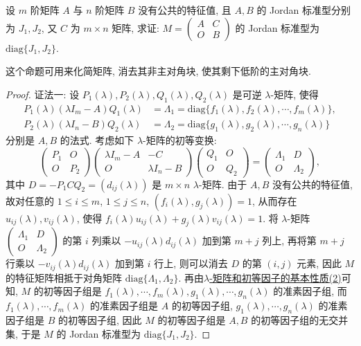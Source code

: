 \documentclass[../../main.tex]{subfiles}
\begin{document}
\begin{proposition}\label{proposition:分块上三角阵的Jordan标准型}
设 $m$ 阶矩阵 $A$ 与 $n$ 阶矩阵 $B$ 没有公共的特征值, 且 $A,B$ 的 Jordan 标准型分别为 $J_1,J_2$, 又 $C$ 为 $m \times n$ 矩阵, 求证: $M = \begin{pmatrix}A & C \\ O & B\end{pmatrix}$ 的 Jordan 标准型为 $\mathrm{diag}\{J_1,J_2\}$.
\end{proposition}
\begin{remark}
这个命题可用来化简矩阵, 消去其非主对角块, 使其剩下低阶的主对角块. 
\end{remark}
\begin{proof}
{\color{blue}证法一:}
设 $P_1(\lambda),P_2(\lambda),Q_1(\lambda),Q_2(\lambda)$ 是可逆 $\lambda$-矩阵, 使得
\begin{align*}
P_1(\lambda)(\lambda I_m - A)Q_1(\lambda) &= \Lambda_1 = \mathrm{diag}\{f_1(\lambda),f_2(\lambda),\cdots,f_m(\lambda)\},\\
P_2(\lambda)(\lambda I_n - B)Q_2(\lambda) &= \Lambda_2 = \mathrm{diag}\{g_1(\lambda),g_2(\lambda),\cdots,g_n(\lambda)\}
\end{align*}
分别是 $A,B$ 的法式. 考虑如下 $\lambda$-矩阵的初等变换:
\[
\begin{pmatrix}P_1 & O \\ O & P_2\end{pmatrix}
\begin{pmatrix}\lambda I_m - A & -C \\ O & \lambda I_n - B\end{pmatrix}
\begin{pmatrix}Q_1 & O \\ O & Q_2\end{pmatrix}
=
\begin{pmatrix}\Lambda_1 & D \\ O & \Lambda_2\end{pmatrix},
\]
其中 $D = -P_1CQ_2 = (d_{ij}(\lambda))$ 是 $m \times n$ $\lambda$-矩阵. 由于 $A,B$ 没有公共的特征值, 故对任意的 $1 \leqslant  i \leqslant  m$, $1 \leqslant  j \leqslant  n$, $(f_i(\lambda),g_j(\lambda)) = 1$, 从而存在 $u_{ij}(\lambda),v_{ij}(\lambda)$, 使得 $f_i(\lambda)u_{ij}(\lambda) + g_j(\lambda)v_{ij}(\lambda) = 1$. 将 $\lambda$-矩阵 $\begin{pmatrix}\Lambda_1 & D \\ O & \Lambda_2\end{pmatrix}$ 的第 $i$ 列乘以 $-u_{ij}(\lambda)d_{ij}(\lambda)$ 加到第 $m + j$ 列上, 再将第 $m + j$ 行乘以 $-v_{ij}(\lambda)d_{ij}(\lambda)$ 加到第 $i$ 行上, 则可以消去 $D$ 的第 $(i,j)$ 元素, 因此 $M$ 的特征矩阵相抵于对角矩阵 $\mathrm{diag}\{\Lambda_1,\Lambda_2\}$. 再由\hyperref[theorem:lambda-矩阵和初等因子的基本性质]{$\lambda$-矩阵和初等因子的基本性质(2)}可知, $M$ 的初等因子组是 $f_1(\lambda),\cdots,f_m(\lambda),g_1(\lambda),\cdots,g_n(\lambda)$ 的准素因子组, 而 $f_1(\lambda),\cdots,f_m(\lambda)$ 的准素因子组是 $A$ 的初等因子组, $g_1(\lambda),\cdots,g_n(\lambda)$ 的准素因子组是 $B$ 的初等因子组, 因此 $M$ 的初等因子组是 $A,B$ 的初等因子组的无交并集, 于是 $M$ 的 Jordan 标准型为 $\mathrm{diag}\{J_1,J_2\}$.


\end{proof}
\end{document}
